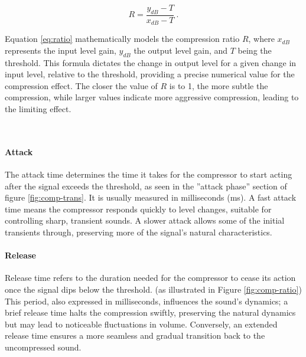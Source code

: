 \documentclass[10pt]{article}
\begin{document}
\begin{multicols*}{2}
                \begin{equation} \label{eq:ratio}
                    R=\frac{y_{dB}-T}{x_{dB}-T}\ .
                \end{equation}

                \noindent Equation \ref{eq:ratio} mathematically models the compression ratio $R$, where $x_{dB}$ represents the input level gain, $y_{dB}$ the output level gain, and $T$ being the threshold. This formula dictates the change in output level for a given change in input level, relative to the threshold, providing a precise numerical value for the compression effect. The closer the value of $R$ is to 1, the more subtle the compression, while larger values indicate more aggressive compression, leading to the limiting effect.

                \noindent
                \begin{minipage}{\linewidth}
                    \centering
                    
                    \label{fig:comp-trans}
                \end{minipage}\\

            \paragraph{Attack}
                The attack time determines the time it takes for the compressor to start acting after the signal exceeds the threshold, as seen in the ''attack phase'' section of figure \ref{fig:comp-trans}. It is usually measured in milliseconds (ms). A fast attack time means the compressor responds quickly to level changes, suitable for controlling sharp, transient sounds. A slower attack allows some of the initial transients through, preserving more of the signal's natural characteristics.

            \paragraph{Release}
                Release time refers to the duration needed for the compressor to cease its action once the signal dips below the threshold. (as illustrated in Figure \ref{fig:comp-ratio}) This period, also expressed in milliseconds, influences the sound's dynamics; a brief release time halts the compression swiftly, preserving the natural dynamics but may lead to noticeable fluctuations in volume. Conversely, an extended release time ensures a more seamless and gradual transition back to the uncompressed sound.


\end{multicols*}
\end{document}
